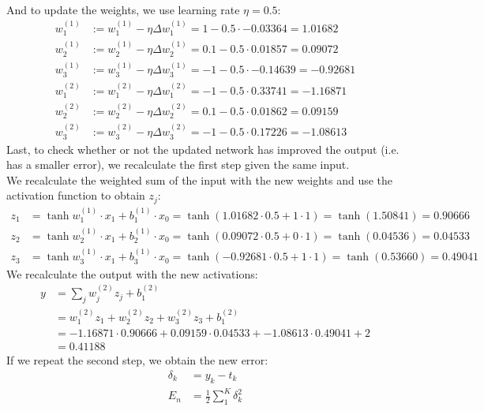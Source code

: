 \documentclass[a4paper,10pt]{article}
\numberwithin{equation}{section} %
\numberwithin{figure}{section} %
\numberwithin{table}{section} %
\theoremstyle{mytheor}
\begin{document}
\begin{enumerate}
\begin{align*}
		\end{align*}
		And to update the weights, we use learning rate $\eta = 0.5$:
		\begin{align*}
		w_1^{(1)} &:= w_1^{(1)} - \eta \Delta w_1^{(1)} = 1 - 0.5 \cdot -0.03364 = 1.01682\\
		w_2^{(1)} &:= w_2^{(1)} - \eta \Delta w_2^{(1)} = 0.1 - 0.5 \cdot 0.01857 = 0.09072\\	
		w_3^{(1)} &:= w_3^{(1)} - \eta \Delta w_3^{(1)} = -1 - 0.5 \cdot -0.14639 = -0.92681\\	
		w_1^{(2)} &:= w_1^{(2)} - \eta \Delta w_1^{(2)} = -1 - 0.5 \cdot 0.33741 = -1.16871\\
		w_2^{(2)} &:= w_2^{(2)} - \eta \Delta w_2^{(2)} = 0.1 - 0.5 \cdot 0.01862 = 0.09159 \\
		w_3^{(2)} &:= w_3^{(2)} - \eta \Delta w_3^{(2)} = -1 - 0.5 \cdot 0.17226 = -1.08613
		\end{align*}
		Last, to check whether or not the updated network has improved the output (i.e. has a smaller error), we recalculate the first step given the same input.\\
		We recalculate the weighted sum of the input with the new weights and use the activation function to obtain $z_j$:
		\begin{align*}
		z_1 &= \tanh w_{1}^{(1)} \cdot x_1 + b_{1}^{(1)} \cdot x_0 = \tanh(1.01682 \cdot 0.5 + 1 \cdot 1) = \tanh(1.50841) = 0.90666\\
		z_2 &= \tanh w_{2}^{(1)} \cdot x_1 + b_{2}^{(1)} \cdot x_0 = \tanh(0.09072 \cdot 0.5 + 0 \cdot 1) = \tanh(0.04536) = 0.04533\\
		z_3 &= \tanh w_{3}^{(1)} \cdot x_1 + b_{3}^{(1)} \cdot x_0 = \tanh(-0.92681 \cdot 0.5 + 1 \cdot 1) = \tanh(0.53660) = 0.49041
		\end{align*}
		We recalculate the output with the new activations:
		\begin{align*}
		y &= \sum_j w_j^{(2)}z_j + b_1^{(2)}\\
		&= w_1^{(2)}z_1 + w_2^{(2)}z_2 + w_3^{(2)}z_3 + b_1^{(2)}\\
		&= -1.16871 \cdot 0.90666 + 0.09159 \cdot 0.04533 + -1.08613 \cdot 0.49041 + 2\\
		&= 0.41188
		\end{align*}
		If we repeat the second step, we obtain the new error:
		\begin{align*}
		\delta_k &= y_k - t_k\\
		E_n &= \frac{1}{2} \sum_1^K \delta_k^2\\

\end{align*}
\end{enumerate}
\end{document}
